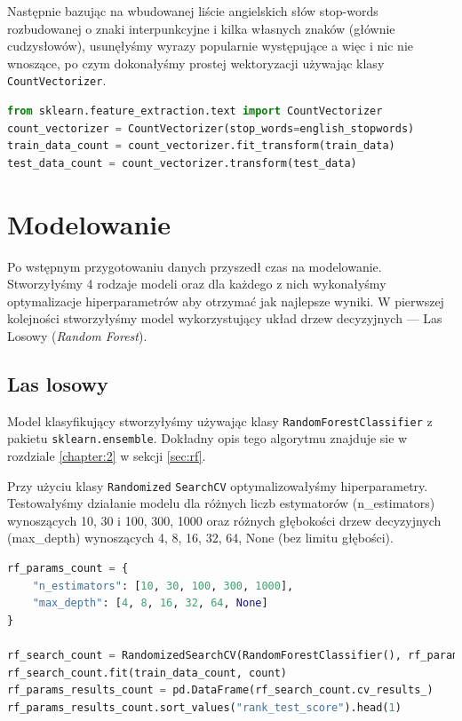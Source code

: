 \noindent Następnie bazując na wbudowanej liście angielskich słów stop-words rozbudowanej o znaki interpunkcyjne i kilka własnych znaków (głównie cudzysłowów), usunęłyśmy wyrazy popularnie występujące a więc i nic nie wnoszące, po czym dokonałyśmy prostej wektoryzacji używając klasy \verb|CountVectorizer|.

\begin{lstlisting}[language=Python,frame=single, breaklines=true, caption=Wektoryzacja zbiorów danych --- treningowego i testowego.,label=code:vectorization]
from sklearn.feature_extraction.text import CountVectorizer
count_vectorizer = CountVectorizer(stop_words=english_stopwords) 
train_data_count = count_vectorizer.fit_transform(train_data)
test_data_count = count_vectorizer.transform(test_data)
\end{lstlisting}



\section{Modelowanie}
Po wstępnym przygotowaniu danych przyszedł czas na modelowanie. Stworzyłyśmy 4 rodzaje modeli oraz dla każdego z nich wykonałyśmy optymalizacje hiperparametrów aby otrzymać jak najlepsze wyniki. W pierwszej kolejności stworzyłyśmy model wykorzystujący układ drzew decyzyjnych --- Las Losowy (\textit{Random Forest}).

\subsection{Las losowy}

Model klasyfikujący stworzyłyśmy używając klasy \verb|RandomForestClassifier| z pakietu \verb|sklearn.ensemble|. Dokładny opis tego algorytmu znajduje sie w rozdziale \ref{chapter:2} w sekcji \ref{sec:rf}.

\noindent Przy użyciu klasy \verb|Randomized| \verb|SearchCV| optymalizowałyśmy hiperparametry. Testowałyśmy działanie modelu dla różnych liczb estymatorów (n\_estimators)  wynoszących 10, 30 i 100, 300, 1000 oraz różnych głębokości drzew decyzyjnych (max\_depth) wynoszących 4, 8, 16, 32, 64, None (bez limitu głębości).

\begin{lstlisting}[language=Python,frame=single, breaklines=true, caption=Modelowanie SVM\_1 (RandomizedSearchCV).,label=code:rf-hiper]
rf_params_count = {
	"n_estimators": [10, 30, 100, 300, 1000],
	"max_depth": [4, 8, 16, 32, 64, None]
}

rf_search_count = RandomizedSearchCV(RandomForestClassifier(), rf_params_count,refit= True, verbose= 3)
rf_search_count.fit(train_data_count, count)
rf_params_results_count = pd.DataFrame(rf_search_count.cv_results_)
rf_params_results_count.sort_values("rank_test_score").head(1)
\end{lstlisting}


